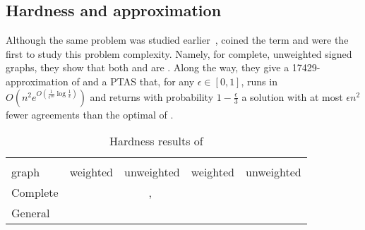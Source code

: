 \subsection{Hardness and approximation}

Although the same problem was studied earlier~\autocites{Early96}{Ben-Dor99}, \textcite{Bansal2002}
coined the term \pcc{} and were the first to study this problem complexity. Namely, for complete,
unweighted signed graphs, they show that both \mind{} and \maxa{} are \NPc{}. Along the way, they
give a 17429-approximation of \mind{} and a PTAS that, for any $\epsilon \in [0,1]$, runs in
$O(n^2e^{O(\frac{1}{\epsilon^{10}}\log\frac{1}{\epsilon})})$ and returns with probability
$1-\frac{\epsilon}{3}$ a solution with at most $\epsilon n^2$ fewer agreements than the optimal of
\maxa{}.

\begin{table}[htpb]
   \centering
   \small
   \caption{Hardness results of \pcc{}} \label{tab:cc_cpx}
   \begin{tabulary}{187mm}{lCCCC}
      \toprule
               &    &                                    \\
      \cmidrule(r){2-3}
      \cmidrule(r){4-5}
      graph    & weighted                      & unweighted                                                     & weighted                                                     & unweighted                   \\
      \midrule
      Complete & \APXh{}~\autocite{Charikar2003} & \NPc{}~\autocite{Bansal2002}, \APXh{}~\autocite{Charikar2003}  &                                                              & \NPc{}~\autocite{Bansal2002} \\
      General  & \APXh{}~\autocites{Charikar2003}{Demaine2003} &  \APXh{}~\autocites{Charikar2003}{Emanuel2003}   &  \\
      \bottomrule
   \end{tabulary}
\end{table}

